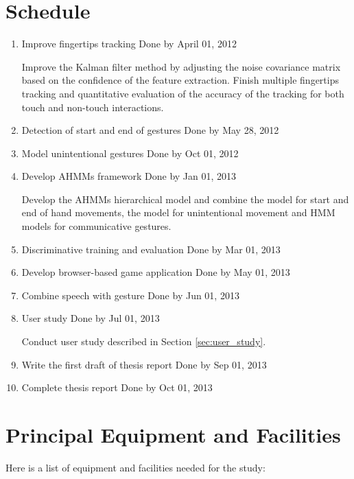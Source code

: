 \section{Schedule}
\begin{enumerate}
  \item Improve fingertips tracking \hfill Done by April 01, 2012

  Improve the Kalman filter method by adjusting the noise covariance matrix
  based on the confidence of the feature extraction. Finish multiple fingertips
  tracking and quantitative evaluation of the accuracy of the tracking for both
  touch and non-touch interactions.

  \item Detection of start and end of gestures \hfill Done by May 28, 2012

  \item Model unintentional gestures \hfill Done by Oct 01, 2012

  \item Develop AHMMs framework	\hfill Done by Jan 01, 2013

  Develop the AHMMs hierarchical model and combine the model for start and
  end of hand movements, the model for unintentional movement and HMM models for
  communicative gestures. 
  
  \item Discriminative training and evaluation \hfill Done by Mar 01, 2013
  
  \item Develop browser-based game application \hfill Done by May 01, 2013
    
  \item Combine speech with gesture	\hfill Done by Jun 01, 2013

  \item User study \hfill Done by Jul 01, 2013

  Conduct user study described in Section \ref{sec:user_study}.
  
  \item Write the first draft of thesis report \hfill Done by Sep 01, 2013
  \item Complete thesis report	\hfill Done by Oct 01, 2013
  \end{enumerate}

\section{Principal Equipment and Facilities}
Here is a list of equipment and facilities needed for the study:

